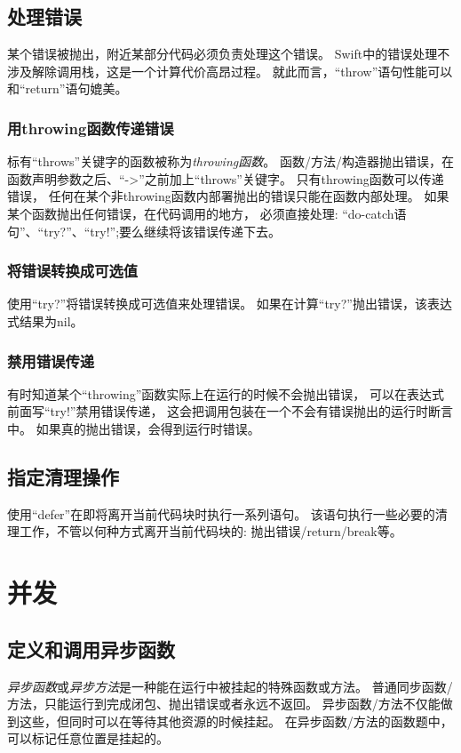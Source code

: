 \documentclass{../main.tex}{subfiles}
\begin{document}
\subsection{处理错误}
某个错误被抛出，附近某部分代码必须负责处理这个错误。
Swift中的错误处理不涉及解除调用栈，这是一个计算代价高昂过程。
就此而言，``throw''语句性能可以和``return''语句媲美。

\subsubsection{用throwing函数传递错误}
标有``throws''关键字的函数被称为\emph{throwing函数}。
函数/方法/构造器抛出错误，在函数声明参数之后、``->''之前加上``throws''关键字。
只有throwing函数可以传递错误，
    任何在某个非throwing函数内部署抛出的错误只能在函数内部处理。
如果某个函数抛出任何错误，在代码调用的地方，
    必须直接处理: ``do-catch语句''、``try?''、``try!'';要么继续将该错误传递下去。

\subsubsection{将错误转换成可选值}
使用``try?''将错误转换成可选值来处理错误。
如果在计算``try?''抛出错误，该表达式结果为nil。

\subsubsection{禁用错误传递}
有时知道某个``throwing''函数实际上在运行的时候不会抛出错误，
    可以在表达式前面写``try!''禁用错误传递，
    这会把调用包装在一个不会有错误抛出的运行时断言中。
如果真的抛出错误，会得到运行时错误。

\subsection{指定清理操作}
使用``defer''在即将离开当前代码块时执行一系列语句。
该语句执行一些必要的清理工作，不管以何种方式离开当前代码块的:
抛出错误/return/break等。

\section{并发}
\subsection{定义和调用异步函数}
\emph{异步函数}或\emph{异步方法}是一种能在运行中被挂起的特殊函数或方法。
普通同步函数/方法，只能运行到完成闭包、抛出错误或者永远不返回。
异步函数/方法不仅能做到这些，但同时可以在等待其他资源的时候挂起。
在异步函数/方法的函数题中，可以标记任意位置是挂起的。
\end{document}
